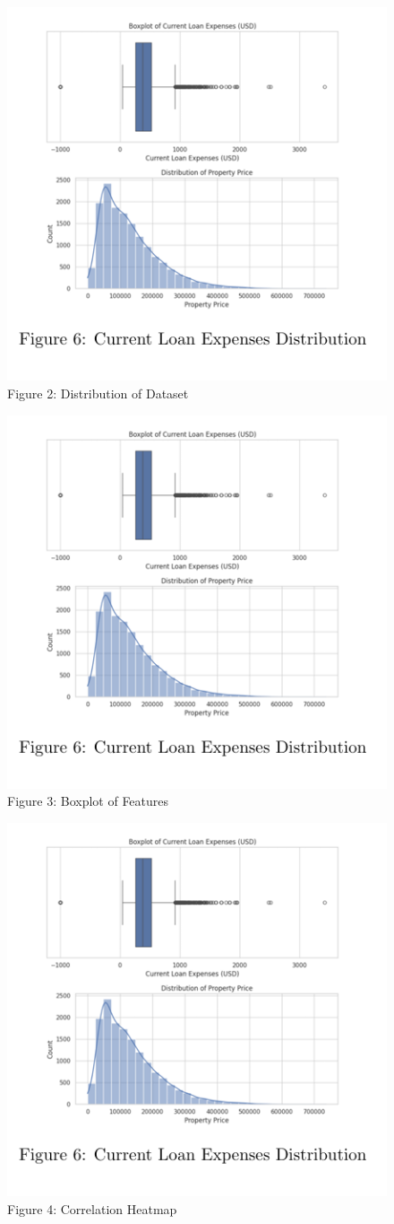 \documentclass[12pt]{article}
\begin{document}
  \begin{figure}[H]
      \centering
      \includegraphics[width=0.5\linewidth]{image.png}
      \caption{Figure 2: Distribution of Dataset}
      \label{fig:enter-label}
  \end{figure}
    \begin{figure}[H]
        \centering
        \includegraphics[width=0.5\linewidth]{image.png}
        \caption{Figure 3: Boxplot of Features}
        \label{fig:enter-label}
    \end{figure}
  \begin{figure}[H]
      \centering
      \includegraphics[width=0.5\linewidth]{image.png}
      \caption{Figure 4: Correlation Heatmap}
      \label{fig:enter-label}
  \end{figure}
\end{document}
